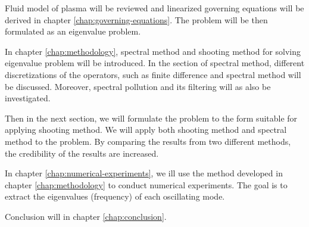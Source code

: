 Fluid model of plasma will be reviewed and linearized governing equations will be derived in chapter \ref{chap:governing-equations}. The problem will be then formulated as an eigenvalue problem.

In chapter \ref{chap:methodology}, spectral method and shooting method for solving eigenvalue problem will be introduced. 
In the section of spectral method, different discretizations of the operators, such as finite difference and spectral method will be discussed.
Moreover, spectral pollution and its filtering will as also be investigated.

Then in the next section, we will formulate the problem to the form suitable for applying shooting method. We will apply both shooting method and spectral method to the problem.
By comparing the results from two different methods, the credibility of the results are increased.

In chapter \ref{chap:numerical-experiments}, we ill use the method developed in chapter \ref{chap:methodology} to conduct numerical experiments. The goal is to extract the eigenvalues (frequency) of each oscillating mode. 

Conclusion will in chapter \ref{chap:conclusion}.